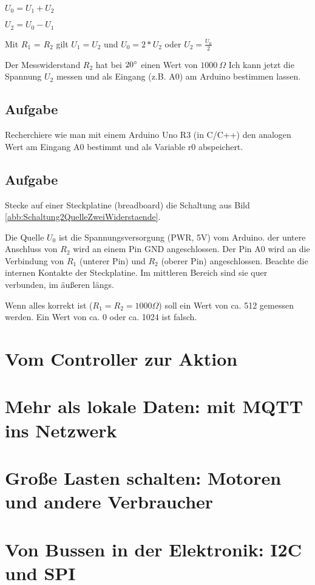 \documentclass[paper = a4]{scrreprt}
\begin{document}
$U_0 = U_1 + U_2$

$U_2 = U_0 - U_1$

Mit $R_1$ = $R_2$ gilt $U_1 = U_2$ und $U_0 = 2 * U_2$ oder $U_2 = \frac{U_0}{2}$

Der Messwiderstand $R_2$ hat bei $20\degree$ einen Wert von $1000\  \Omega$ Ich kann jetzt die Spannung $U_2$ messen und als Eingang (z.B. A0) am Arduino bestimmen lassen.
\section{Aufgabe}
Recherchiere wie man mit einem Arduino Uno R3 (in C/C++) den analogen Wert am Eingang A0 bestimmt und als Variable r0 abspeichert.

\section{Aufgabe}
Stecke auf einer Steckplatine (breadboard) die Schaltung aus Bild \ref{abb:Schaltung2QuelleZweiWiderstaende}.

Die Quelle $U_0$ ist die Spannungsversorgung (PWR, 5V) vom Arduino. der untere Anschluss von $R_2$ wird an einem Pin GND angeschlossen. Der Pin A0 wird an die Verbindung von $R_1$ (unterer Pin) und $R_2$ (oberer Pin) angeschlossen. Beachte die internen Kontakte der Steckplatine. Im mittleren Bereich sind sie quer verbunden, im äußeren längs.

Wenn alles korrekt ist ($R_1 = R_2 = 1000 \Omega$) soll ein Wert von ca. 512 gemessen werden. Ein Wert von ca. 0 oder ca. 1024 ist falsch.

\chapter{Vom Controller zur Aktion}
\label{chapter:AusgabeLed}

\chapter{Mehr als lokale Daten: mit MQTT ins Netzwerk}
\label{chapter:Mqtt}

\chapter{Große Lasten schalten: Motoren und andere Verbraucher}
\label{chapter:MotorAnsteuern}

\chapter{Von Bussen in der Elektronik: I2C und SPI}
\label{chapter:BusseI2cSpi}
\end{document}
